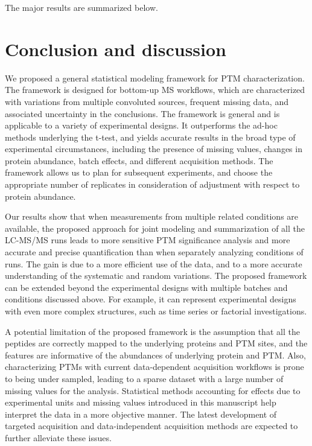 \documentclass[mcp]{article}
\numberwithin{figure}{section} %
\numberwithin{table}{section}
\begin{document}
The major results are summarized below.

\section{Conclusion and discussion}

We proposed a general statistical modeling framework for PTM characterization. The framework is designed for bottom-up MS workflows, which are characterized with variations from multiple convoluted sources, frequent missing data, and associated uncertainty in the conclusions. The framework is general and is applicable to a variety of experimental designs. It outperforms the ad-hoc methods underlying the t-test, and yields accurate results in the broad type of experimental circumstances, including the presence of missing values, changes in protein abundance, batch effects, and different acquisition methods. The framework allows us to plan for subsequent experiments, and choose the appropriate number of replicates in consideration of adjustment with respect to protein abundance. 

Our results show that when measurements from multiple related conditions are available, the proposed approach for joint modeling and summarization of all the LC-MS/MS runs leads to more sensitive PTM significance analysis and more accurate and precise quantification than when separately analyzing conditions of runs. The gain is due to a more efficient use of the data, and to a more accurate understanding of the systematic and random variations. The proposed framework can be extended beyond the experimental designs with multiple batches and conditions discussed above. For example, it can represent experimental designs with even more complex structures, such as time series or factorial investigations. 

A potential limitation of the proposed framework is the assumption that all the peptides are correctly mapped to the underlying proteins and PTM sites, and the features are informative of the abundances of underlying protein and PTM. Also, characterizing PTMs with current data-dependent acquisition workflows is prone to being under sampled, leading to a sparse dataset with a large number of missing values for the analysis. Statistical methods accounting for effects due to experimental units and missing values introduced in this manuscript help interpret the data in a more objective manner. The latest development of targeted acquisition and data-independent acquisition methods are expected to further alleviate these issues. 
\end{document}
